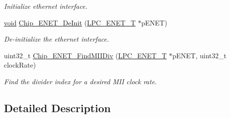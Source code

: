 \begin{DoxyCompactItemize}
\begin{DoxyCompactList}\small\item\em Initialize ethernet interface. \end{DoxyCompactList}\item 
\hyperlink{Paradigm_2Tern__EE_2small_2portmacro_8h_a14d32f8130d3c0b212cfc751730b5b49}{void} \hyperlink{group__ENET__17XX__40XX_ga94eb7a70f4023c83ca18e4e675ad0b32}{Chip\-\_\-\-E\-N\-E\-T\-\_\-\-De\-Init} (\hyperlink{structLPC__ENET__T}{L\-P\-C\-\_\-\-E\-N\-E\-T\-\_\-\-T} $\ast$p\-E\-N\-E\-T)
\begin{DoxyCompactList}\small\item\em De-\/initialize the ethernet interface. \end{DoxyCompactList}\item 
uint32\-\_\-t \hyperlink{group__ENET__17XX__40XX_gad107338dec5ee221957fafe5e711e42e}{Chip\-\_\-\-E\-N\-E\-T\-\_\-\-Find\-M\-I\-I\-Div} (\hyperlink{structLPC__ENET__T}{L\-P\-C\-\_\-\-E\-N\-E\-T\-\_\-\-T} $\ast$p\-E\-N\-E\-T, uint32\-\_\-t clock\-Rate)
\begin{DoxyCompactList}\small\item\em Find the divider index for a desired M\-I\-I clock rate. \end{DoxyCompactList}\end{DoxyCompactItemize}


\subsection{Detailed Description}


